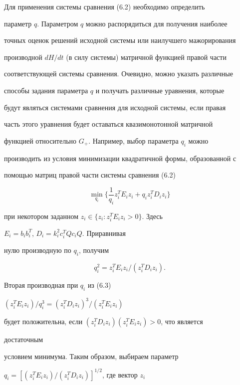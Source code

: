  


Для применения системы сравнения (6.2) необходимо определить 


параметр $q$. Параметром $q$ можно распорядиться для получения наиболее 


точных оценок решений исходной системы или наилучшего мажорирования 


производной $d H/d t$ (в силу системы) матричной функцией правой части 


соответствующей системы сравнения. Очевидно, можно указать различные 


способы задания параметра $q$ и получать различные уравнения, которые 


будут являться системами сравнения для исходной системы, если правая 


часть этого уравнения будет оставаться квазимонотонной матричной 


функцией относительно $G_+$. Например, выбор параметра $q_i$ можно 


производить из условия минимизации квадратичной формы, образованной с 


помощью матриц правой части системы сравнения (6.2) 


$$ 


\min_{q_i}\bigg\{\frac{1}{q_i}z^T_i E_i z_i+q_i 


z^T_i D_i z_i\bigg\} 


$$ 


при некотором заданном $z_i\in\{z_i:z^T_i E_i z_i>0\}$. Здесь 


$E_i=b_i b_i^T$, $D_i=k_i^2c_i^T Q c_i Q$. Приравнивая 


нулю производную по $q_i$, получим 


\begin{equation} 


q^2_i=z^T_i E_i z_i/(z^T_i D_i z_i). 


\end{equation} 


Вторая производная при $q_i$ из (6.3) 


$(z_i^T E_i z_i)/q_i^3=(z_i^T D_i z_i)^3/(z_i^T E_i z_i)$ 


будет положительна, если $(z_i^T D_i z_i)(z_i^T E_i z_i)>0$, что является 


достаточным 


условием минимума. Таким образом, выбираем параметр 


$q_i=[(z_i^T E_i z_i)/(z_i^T D_i z_i)]^{1/2}$, где вектор $z_i$ 


